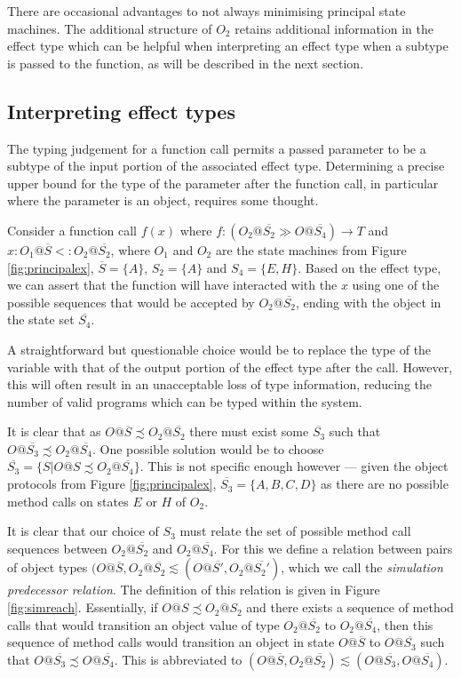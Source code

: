 \documentclass[preprint]{sigplanconf}
\makeatletter
\newcommand{\figref}[1]{Figure \ref{#1}}
\newcommand{\ot}[2]{#1@\overline{#2}}
\makeatother
\begin{document}
There are occasional advantages to not always minimising principal state
machines. The additional structure of $O_2$ retains additional information
in the effect type which can be helpful when interpreting an effect type
when a subtype is passed to the function, as will be described in the next
section.

\subsection{Interpreting effect types}

The typing judgement for a function call permits a passed parameter to
be a subtype of the input portion of the associated effect type.
Determining a precise upper bound for the type of the parameter after the
function call, in particular where the parameter is an object, 
requires some thought.

Consider a function call $f(x)$ where
$f : (O_2@\overline{S_2} \gg O@\overline{S_4}) \rightarrow T$ and
$x : O_1@\overline{S} <: O_2@\overline{S_2}$, where $O_1$ and $O_2$
are the state machines from \figref{fig:principalex}, 
$\overline{S} = \{ A \}$, $S_2 = \{ A \}$ and $S_4 = \{E, H\}$. 
Based on the effect type,
we can assert that the function will have interacted with the $x$ using
one of the possible sequences that would be accepted by $O_2@\overline{S_2}$,
ending with the object in the state set $\overline{S_4}$. 

A straightforward but questionable choice would 
be to replace the type of the variable
with that of the output portion of the effect type after the call. However,
this will often result in an unacceptable loss of type information,
reducing the number of valid programs which can be typed within the system.

It is clear that as $\ot{O}{S} \precsim \ot{O_2}{S_2}$ there must exist some
$\overline{S_3}$ such that $\ot{O}{S_3} \precsim \ot{O_2}{S_4}$.
One possible solution would be to choose
$\overline{S_3} = \{ S | O@S \precsim \ot{O_2}{S_4} \}$. This is not specific
enough however --- given the object protocols from \figref{fig:principalex},
$\overline{S_3} = \{ A, B, C, D \}$ as there are no possible method calls
on states $E$ or $H$ of $O_2$.

It is clear that our choice of $S_3$ must relate the set of possible method
call sequences between $\ot{O_2}{S_2}$ and $\ot{O_2}{S_4}$. For this we
define a relation between pairs of object types
$(O@\overline{S}, O_2@\overline{S_2} \lesssim 
(O@\overline{S'}, O_2@\overline{S_2'})$, which we call the
{\it simulation predecessor relation}. The definition of this relation
is given in \figref{fig:simreach}. Essentially, if $O@S \precsim O_2@S_2$ and there
exists a sequence of method calls that would transition an object value of type
$O_2@\overline{S_2}$ to $O_2@\overline{S_4}$, then this sequence of method calls
would transition an object in state $O@\overline{S}$ to $O@\overline{S_3}$
such that $O@\overline{S_3} \precsim O@\overline{S_4}$. This is abbreviated to
$(O@\overline{S}, O_2@\overline{S_2}) \lesssim (O@\overline{S_3}, O@\overline{S_4})$.
\end{document}
